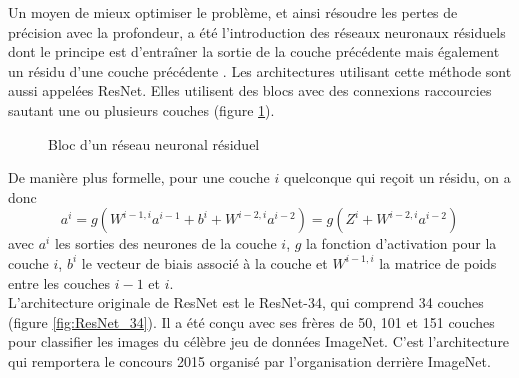 \documentclass[12pt,english, openany]{book}
\begin{document}
Un moyen de mieux optimiser le problème, et ainsi résoudre les pertes de précision avec la profondeur, a été l'introduction des réseaux neuronaux résiduels dont le principe est d'entraîner la sortie de la couche précédente mais également un résidu d'une couche précédente \cite{he2015deep}. Les architectures utilisant cette méthode sont aussi appelées ResNet. Elles utilisent des blocs avec des connexions raccourcies sautant une ou plusieurs couches (figure \ref{fig:residual_bloc}).\\


\begin{figure}[ht]
    \centering
    
    
    \caption{Bloc d'un réseau neuronal résiduel}
    \label{fig:residual_bloc}
\end{figure}

De manière plus formelle, pour une couche $i$ quelconque qui reçoit un résidu, on a donc
$$
a^i = g(W^{i-1,i}a^{i-1}+b^i+W^{i-2,i}a^{i-2}) = g(Z^i+W^{i-2,i}a^{i-2})
$$
avec $a^i$ les sorties des neurones de la couche $i$, $g$ la fonction d'activation pour la couche $i$, $b^i$ le vecteur de biais associé à la couche et $W^{i-1,i}$ la matrice de poids entre les couches $i-1$ et $i$.\\

L'architecture originale de ResNet est le ResNet-34, qui comprend 34 couches (figure \ref{fig:ResNet_34}). Il a été conçu avec ses frères de 50, 101 et 151 couches pour classifier les images du célèbre jeu de données ImageNet. C'est l'architecture qui remportera le concours 2015 organisé par l'organisation derrière ImageNet. \\
\end{document}
